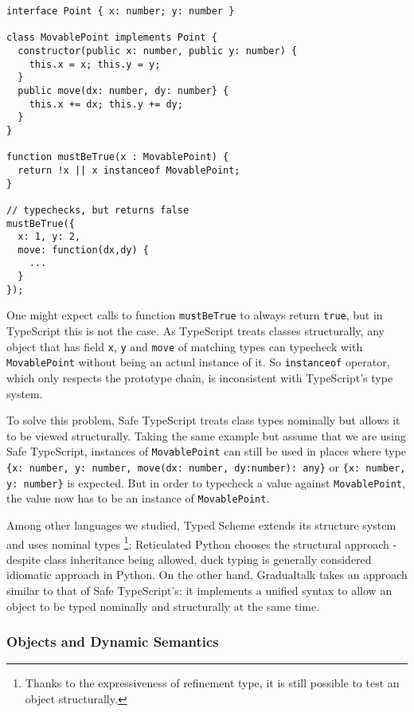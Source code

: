 \begin{verbatim}
interface Point { x: number; y: number }

class MovablePoint implements Point {
  constructor(public x: number, public y: number) {
    this.x = x; this.y = y;
  }
  public move(dx: number, dy: number} {
    this.x += dx; this.y += dy;
  }
}

function mustBeTrue(x : MovablePoint) {
  return !x || x instanceof MovablePoint;
}

// typechecks, but returns false
mustBeTrue({
  x: 1, y: 2,
  move: function(dx,dy) {
    ...
  }
});
\end{verbatim}

One might expect calls to function \texttt{mustBeTrue} to always return \texttt{true},
but in TypeScript this is not the case.
As TypeScript treats classes structurally, any object that has field \texttt{x}, \texttt{y} and \texttt{move}
of matching types can typecheck with \texttt{MovablePoint} without being an actual instance of it.
So \texttt{instanceof} operator, which only respects the prototype chain,
is inconsistent with TypeScript's type system.

To solve this problem, Safe TypeScript treats class types nominally but allows it to be viewed structurally.
Taking the same example but assume that we are using Safe TypeScript,
instances of \texttt{MovablePoint} can still be used in places where type
\texttt{\{x: number, y: number, move(dx: number, dy:number): any\}}
or \texttt{\{x: number, y: number\}} is expected.
But in order to typecheck a value against \texttt{MovablePoint},
the value now has to be an instance of \texttt{MovablePoint}.

Among other languages we studied,
Typed Scheme extends its structure system and uses nominal types \footnote{Thanks to the expressiveness of refinement type, it is still possible to test an object structurally.};
Reticulated Python chooses the structural approach - despite class inheritance being allowed,
duck typing is generally considered idiomatic approach in Python.
On the other hand, Gradualtalk takes an approach similar to that of Safe TypeScript's:
it implements a unified syntax to allow an object to be typed nominally and structurally at the same time.

\subsubsection{Objects and Dynamic Semantics}


